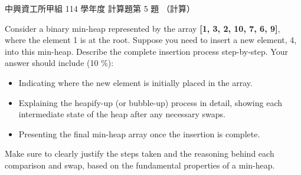 \begin{pastexam}[label={px:nchu-114-dsa-25}]{中興資工所甲組 114 學年度 計算題第 5 題}
（計算）

Consider a binary min-heap represented by the array \textbf{[1, 3, 2, 10, 7, 6, 9]}, where the element 1 is at the root. Suppose you need to insert a new element, 4, into this min-heap. Describe the complete insertion process step-by-step. Your answer should include (10 \%):
\begin{itemize}
\item Indicating where the new element is initially placed in the array.
\item Explaining the heapify-up (or bubble-up) process in detail, showing each intermediate state of the heap after any necessary swaps.
\item Presenting the final min-heap array once the insertion is complete.
\end{itemize}
Make sure to clearly justify the steps taken and the reasoning behind each comparison and swap, based on the fundamental properties of a min-heap.
\end{pastexam}

